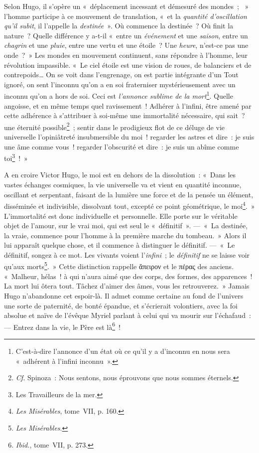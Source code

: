 \documentclass[french,twoside]{book} %
\begin{document}
\noindent Selon Hugo, il s’opère un « déplacement incessant et démesuré des mondes ;  » l’homme participe à ce mouvement de translation, « et la \emph{quantité d’oscillation qu’il subit}, il l’appelle la \emph{destinée} ». Où commence la destinée ? Où finit la nature ? Quelle différence y a-t-il « entre un \emph{événement} et une \emph{saison}, entre un \emph{chagrin} et une \emph{pluie}, entre une vertu et une étoile ? Une \emph{heure}, n’est-ce pas une onde ? » Les mondes en mouvement continuent, sans répondre à l’homme, leur révolution impassible. « Le ciel étoile est une vision de roues, de balanciers et de contrepoids… On se voit dans l’engrenage, on est partie intégrante d’un Tout ignoré, on sent l’inconnu qu’on a en soi fraterniser mystérieusement avec un inconnu qu’on a hors de soi. Ceci est \emph{l’annonce sublime de la mort}\footnote{C’est-à-dire l’annonce d’un état où ce qu’il y a d’inconnu en nous sera « adhérent à l’infini inconnu ».}. Quelle angoisse, et en même temps quel ravissement ! Adhérer à l’infini, être amené par cette adhérence à s’attribuer à soi-même une immortalité nécessaire, qui sait ? une éternité possible\footnote{\emph{Cf.} Spinoza : Nous sentons, nous éprouvons que nous sommes éternels.} ; sentir dans le prodigieux flot de ce déluge de vie universelle l’opiniâtreté insubmersible du moi ! regarder les astres et dire : je suis une âme comme vous ! regarder l’obscurité et dire : je suis un abîme comme toi\footnote{Les Travailleurs de la mer.} ! »\par
A en croire Victor Hugo, le moi est en dehors de la dissolution : « Dans les vastes échanges cosmiques, la vie universelle va et vient en quantité inconnue, oscillant et serpentant, faisant de la lumière une force et de la pensée un élément, disséminée et indivisible, dissolvant tout, excepté ce point géométrique, le moi\footnote{\emph{Les Misérables}, tome VII, p. 160.}. » L’immortalité est donc individuelle et personnelle. Elle porte sur le véritable objet de l’amour, sur le vrai moi, qui est seul le « définitif ». — « La destinée, la vraie, commence pour l’homme à la première marche du tombeau. » Alors il lui apparaît quelque chose, et il commence à distinguer le définitif. — « Le définitif, songez à ce mot. Les vivants voient l’\emph{infini} ; le \emph{définitif} ne se laisse voir qu’aux morts\footnote{\emph{Les Misérables}.}. » Cette distinction rappelle ἅπειρον et le πἐρας des anciens. « Malheur, hélas ! à qui n’aura aimé que des corps, des formes, des apparences ! La mort lui ôtera tout. Tâchez d’aimer des âmes, vous les retrouverez. » Jamais Hugo n’abandonne cet espoir-là. Il admet comme certaine au fond de l’univers une sorte de paternité, de bonté épandue, et s’écrierait volontiers, avec la foi absolue et naïve de l’évêque Myriel parlant à celui qui va mourir sur l’échafaud : — Entrez dans la vie, le Père est là\footnote{\emph{Ibid.}, tome VII, p. 273.} !\par
\end{document}
